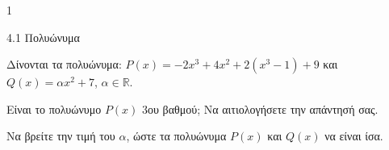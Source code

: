 \begin{ylh}{1}
\item 4.1 Πολυώνυμα
\end{ylh}
Δίνονται τα πολυώνυμα:
$P(x) = -2x^3 + 4x^2 + 2(x^3 - 1) + 9$ και $Q(x) = \alpha x^2 + 7$, $\alpha \in \mathbb{R}$.
\begin{alist}
\item Είναι το πολυώνυμο $P(x)$ 3ου βαθμού; Να αιτιολογήσετε την απάντησή σας.
\item Να βρείτε την τιμή του $\alpha$, ώστε τα πολυώνυμα $P(x)$ και $Q(x)$ να είναι ίσα.
\end{alist}

